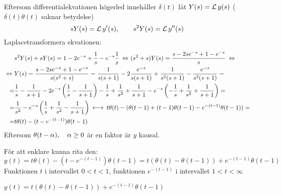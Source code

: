 \begin{task}{5.11}
	Eftersom differentialekvationen högerled innehåller $\delta(t)$ låt $Y(s)=\operatorname{\mathcal{L}} y(s)$ ($\delta(t)\theta(t)$ saknar betydelse)
	\[sY(s)=\operatorname{\mathcal{L}} y'(s),\qquad s^2Y(s)=\operatorname{\mathcal{L}} y''(s)\]
	Laplacetransformera ekvationen:
	\begin{align*}
	&s^2Y(s)+sY(s)=1-2e^{-s}+\frac{1}{s}-e^{-s}\frac{1}{s} \lra
	(s^2+s)Y(s)=\frac{s-2se^{-s}+1-e^{-s}}{s}\lra \\ \lra
	&Y(s)=\frac{s-2se^{-s}+1-e^{-s}}{s(s^2+s)}=
	\frac{1}{s(s+1)}-2\frac{e^{-s}}{s(s+1)}+\frac{1}{s^2(s+1)}-\frac{e^{-s}}{s^2(s+1)}= \\ =
	&\frac{1}{s}-\frac{1}{s+1}-2e^{-s}\left(\frac{1}{s}-\frac{1}{s+1}\right)-\frac{1}{s}+\frac{1}{s^2}+\frac{1}{s+1}-e^{-s}\left(-\frac{1}{s}+\frac{1}{s^2}+\frac{1}{s+1}\right)= \\ =
	&\frac{1}{s^2}-e^{-s}\left(\frac{1}{s}+\frac{1}{s^2}-\frac{1}{s+1}\right) \llra
	t\theta(t)-(\theta(t-1)+(t-1)\theta(t-1)-e^{-(t-1)}\theta(t-1))= \\ =
	&t\theta(t)-(t-e^{-(t-1)})\theta(t-1)
	\end{align*}
	Eftersom $\theta(t-\alpha), \quad \alpha \ge 0$ är en faktor är $y$ kausal.
	
	För att enklare kunna rita den:
	\[y(t)=t\theta(t)-(t-e^{-(t-1)})\theta(t-1)=t(\theta(t)-\theta(t-1))+e^{-(t-1)}\theta(t-1)\]
	Funktionen $t$ i intervallet $0<t<1$, funktionen $e^{-(t-1)}$ i intervallet $1<t<\infty$
	
	\ans $y(t)=t(\theta(t)-\theta(t-1))+e^{-(t-1)}\theta(t-1)$
\end{task}
